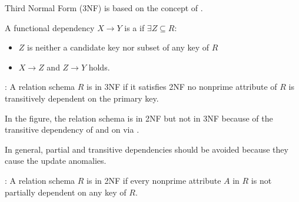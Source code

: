     \par Third Normal Form (3NF) is based on the concept of .
    \par A functional dependency $X \to Y$ is a  if $\exists Z \subseteq R$:
    \begin{itemize}
      \item $Z$ is neither a candidate key nor subset of any key of $R$
      \item $X \to Z$ and $Z \to Y$ holds.
    \end{itemize}
    \par {}: A relation schema $R$ is in 3NF if it satisfies 2NF  no nonprime attribute of $R$ is transitively dependent on the primary key.
    \par In the figure, the relation schema  is in 2NF but not in 3NF because of the transitive dependency of  and  on  via .

    \par In general, partial and transitive dependencies should be avoided because they cause the update anomalies.

    \par {}: A relation schema $R$ is in 2NF if every nonprime attribute $A$ in $R$ is not partially dependent on any key of $R$.
